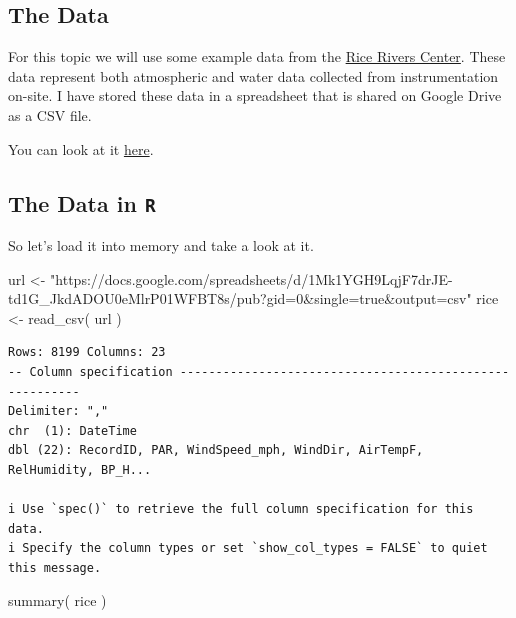 \documentclass[
  letterpaper,
]{book}
\newenvironment{Shaded}{\begin{snugshade}}{\end{snugshade}}
\newcommand{\FunctionTok}[1]{\textcolor[rgb]{0.28,0.35,0.67}{#1}}
\newcommand{\NormalTok}[1]{\textcolor[rgb]{0.00,0.23,0.31}{#1}}
\newcommand{\OtherTok}[1]{\textcolor[rgb]{0.00,0.23,0.31}{#1}}
\newcommand{\StringTok}[1]{\textcolor[rgb]{0.13,0.47,0.30}{#1}}
\begin{document}
\subsection{The Data}\label{the-data}

For this topic we will use some example data from the
\href{https://ricerivers.vcu.edu}{Rice Rivers Center}. These data
represent both atmospheric and water data collected from instrumentation
on-site. I have stored these data in a spreadsheet that is shared on
Google Drive as a CSV file.

You can look at it
\href{https://docs.google.com/spreadsheets/d/1Mk1YGH9LqjF7drJE-td1G_JkdADOU0eMlrP01WFBT8s}{here}.

\subsection{\texorpdfstring{The Data in
\texttt{R}}{The Data in R}}\label{the-data-in-r}

So let's load it into memory and take a look at it.

\begin{Shaded}
\begin{Highlighting}[]
\NormalTok{url }\OtherTok{\textless{}{-}} \StringTok{"https://docs.google.com/spreadsheets/d/1Mk1YGH9LqjF7drJE{-}td1G\_JkdADOU0eMlrP01WFBT8s/pub?gid=0\&single=true\&output=csv"}
\NormalTok{rice }\OtherTok{\textless{}{-}} \FunctionTok{read\_csv}\NormalTok{( url )}
\end{Highlighting}
\end{Shaded}

\begin{verbatim}
Rows: 8199 Columns: 23
-- Column specification --------------------------------------------------------
Delimiter: ","
chr  (1): DateTime
dbl (22): RecordID, PAR, WindSpeed_mph, WindDir, AirTempF, RelHumidity, BP_H...

i Use `spec()` to retrieve the full column specification for this data.
i Specify the column types or set `show_col_types = FALSE` to quiet this message.
\end{verbatim}

\begin{Shaded}
\begin{Highlighting}[]
\FunctionTok{summary}\NormalTok{( rice )}
\end{Highlighting}
\end{Shaded}
\end{document}
